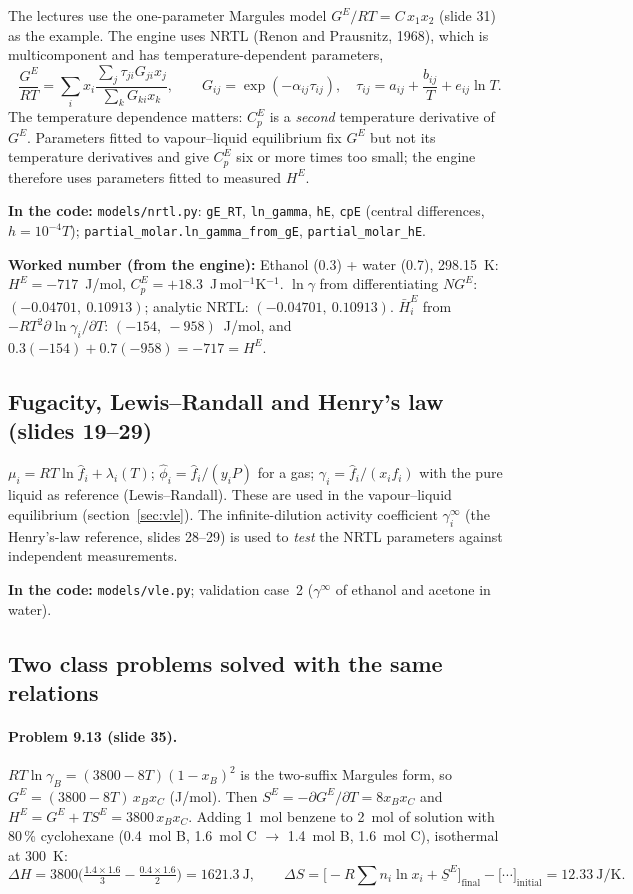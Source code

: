 \documentclass[11pt,a4paper]{article}
\newcommand{\code}[1]{\texttt{\small #1}}
\newcommand{\where}[1]{\par\noindent\textbf{In the code:} #1\par}
\newcommand{\num}[1]{\par\noindent\textbf{Worked number (from the engine):} #1\par}
\begin{document}
The lectures use the one-parameter Margules model $G^E/RT=C\,x_1x_2$ (slide 31) as the example. The engine
uses NRTL (Renon and Prausnitz, 1968), which is multicomponent and has temperature-dependent parameters,
\[
\frac{G^E}{RT}=\sum_i x_i\frac{\sum_j\tau_{ji}G_{ji}x_j}{\sum_k G_{ki}x_k},\qquad G_{ij}=\exp(-\alpha_{ij}\tau_{ij}),
\quad \tau_{ij}=a_{ij}+\frac{b_{ij}}T+e_{ij}\ln T .
\]
The temperature dependence matters: $C_p^E$ is a \emph{second} temperature derivative of $G^E$. Parameters
fitted to vapour--liquid equilibrium fix $G^E$ but not its temperature derivatives and give $C_p^E$
six or more times too small; the engine therefore uses parameters fitted to measured $H^E$.
\where{\code{models/nrtl.py}: \code{gE\_RT}, \code{ln\_gamma}, \code{hE}, \code{cpE} (central differences,
$h=10^{-4}T$); \code{partial\_molar.ln\_gamma\_from\_gE}, \code{partial\_molar\_hE}.}
\num{Ethanol (0.3) + water (0.7), 298.15~K: $H^E=-717$~J/mol, $C_p^E=+18.3$~J\,mol$^{-1}$K$^{-1}$.
$\ln\gamma$ from differentiating $N G^E$: $(-0.04701,\ 0.10913)$; analytic NRTL: $(-0.04701,\ 0.10913)$.
$\bar H^E_i$ from $-RT^2\partial\ln\gamma_i/\partial T$: $(-154,\ -958)$~J/mol, and
$0.3(-154)+0.7(-958)=-717=H^E$.}

\subsection{Fugacity, Lewis--Randall and Henry's law (slides 19--29)}
$\mu_i=RT\ln\hat f_i+\lambda_i(T)$; $\hat\phi_i=\hat f_i/(y_iP)$ for a gas; $\gamma_i=\hat f_i/(x_if_i)$ with
the pure liquid as reference (Lewis--Randall). These are used in the vapour--liquid equilibrium
(section~\ref{sec:vle}). The infinite-dilution activity coefficient $\gamma_i^\infty$ (the Henry's-law
reference, slides 28--29) is used to \emph{test} the NRTL parameters against independent measurements.
\where{\code{models/vle.py}; validation case~2 ($\gamma^\infty$ of ethanol and acetone in water).}

\subsection{Two class problems solved with the same relations}
\paragraph{Problem 9.13 (slide 35).} $RT\ln\gamma_B=(3800-8T)(1-x_B)^2$ is the two-suffix Margules form, so
$G^E=(3800-8T)\,x_Bx_C$ (J/mol). Then $S^E=-\partial G^E/\partial T=8x_Bx_C$ and
$H^E=G^E+TS^E=3800\,x_Bx_C$. Adding 1~mol benzene to 2~mol of solution with 80\,\% cyclohexane
(0.4~mol B, 1.6~mol C $\to$ 1.4~mol B, 1.6~mol C), isothermal at 300~K:
\[
\Delta H=3800\Big(\tfrac{1.4\times1.6}{3}-\tfrac{0.4\times1.6}{2}\Big)=1621.3\ \mathrm J,\qquad
\Delta S=\big[-R\textstyle\sum n_i\ln x_i+\underline S^E\big]_{\text{final}}-\big[\cdots\big]_{\text{initial}}=12.33\ \mathrm{J/K}.
\]
\end{document}
